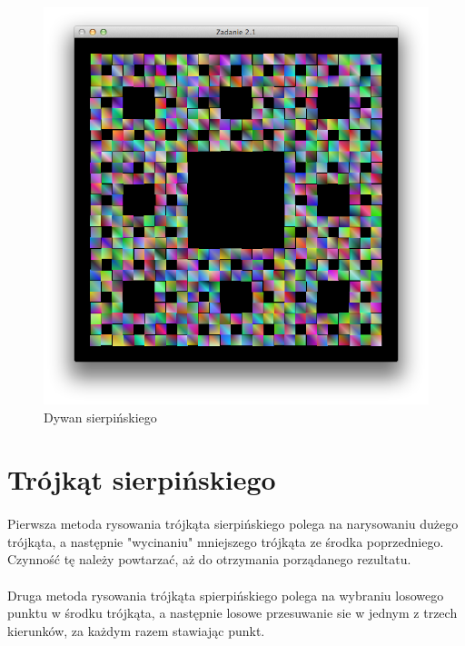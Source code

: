 \documentclass[wide,a4paper,titlepage,12pt] {article}
\begin{document}
  \begin{figure}[htbp]
    \begin{center}
      \includegraphics[scale=0.6]{dywan.png}
      \caption{Dywan sierpińskiego}
    \end{center}
  \end{figure}

  \newpage

  \section{Trójkąt sierpińskiego}
  \paragraph{}
  Pierwsza metoda rysowania trójkąta sierpińskiego polega na narysowaniu dużego trójkąta,
  a następnie "wycinaniu" mniejszego trójkąta ze środka poprzedniego. Czynność tę należy powtarzać,
  aż do otrzymania porządanego rezultatu.

  \paragraph{}
  Druga metoda rysowania trójkąta spierpińskiego polega na wybraniu losowego punktu
  w środku trójkąta, a następnie losowe przesuwanie sie w jednym z trzech kierunków,
  za każdym razem stawiając punkt.
\end{document}
